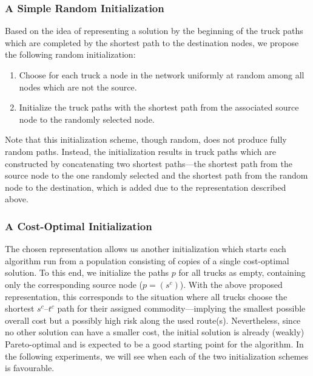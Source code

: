 \documentclass[preprint,12pt]{elsarticle}
\begin{document}
\subsubsection{A Simple Random Initialization}
Based on the idea of representing a solution by the beginning of the truck paths which are completed by the shortest path to the destination nodes, we propose the following random initialization:
\begin{enumerate}
	\item Choose for each truck a node in the network uniformly at random among all nodes which are not the source.
	\item Initialize the truck paths with the shortest path from the associated source node to the randomly selected node.
\end{enumerate}
Note that this initialization scheme, though random, does not produce fully random paths. Instead, the initialization results in truck paths which are constructed by concatenating two shortest paths---the shortest path from the source node to the one randomly selected and the shortest path from the random node to the destination, which is added due to the representation described above.

\subsubsection{A Cost-Optimal Initialization}
The chosen representation allows us another initialization which starts each algorithm run from a population consisting of copies of a single cost-optimal solution. To this end, we initialize the paths $p$ for all trucks as empty, containing only the corresponding source node ($p=(s^c)$). With the above proposed representation, this corresponds to the situation where all trucks choose the shortest $s^c$--$t^c$ path for their assigned commodity---implying the smallest possible overall cost but a possibly high risk along the used route(s). Nevertheless, since no other solution can have a smaller cost, the initial solution is already (weakly) Pareto-optimal and is expected to be a good starting point for the algorithm. In the following experiments, we will see when each of the two initialization schemes is favourable.
\end{document}
